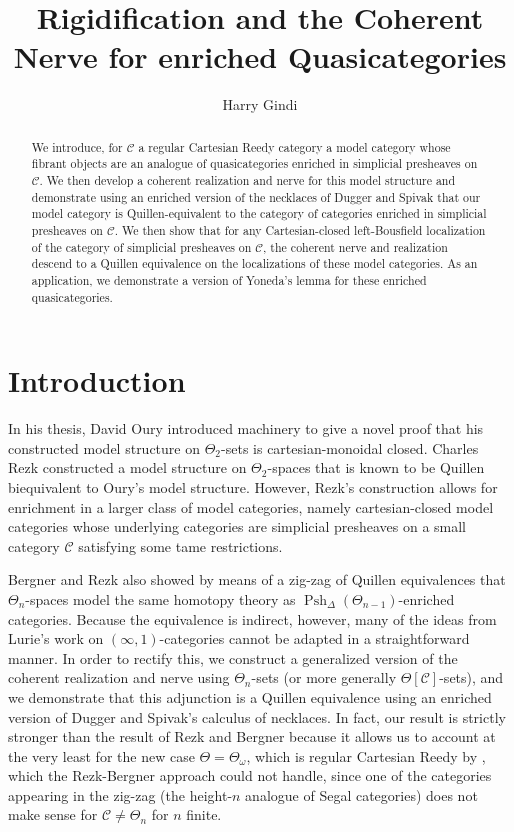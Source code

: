 \documentclass[leqno]{article}
\title{Rigidification and the Coherent Nerve for enriched Quasicategories}
\author{Harry Gindi}
\date{}
\numberwithin{equation}{subsection}
\theoremstyle{plain}   %
\theoremstyle{remark}
\theoremstyle{plain}
\DeclareMathOperator{\Psh}{Psh}
\renewcommand{\C}{\ensuremath{\mathcal{C}}}
\begin{document}
\maketitle

\begin{abstract}
	We introduce, for \(\C\) a regular Cartesian Reedy category a model category whose fibrant objects are an analogue of quasicategories enriched in simplicial presheaves on \(\C\).  We then develop a coherent realization and nerve for this model structure and demonstrate using an enriched version of the necklaces of Dugger and Spivak that our model category is Quillen-equivalent to the category of categories enriched in simplicial presheaves on \(\C\).  We then show that for any Cartesian-closed left-Bousfield localization of the category of simplicial presheaves on \(\C\), the coherent nerve and realization descend to a Quillen equivalence on the localizations of these model categories. As an application, we demonstrate a version of Yoneda's lemma for these enriched quasicategories.
\end{abstract}

\tableofcontents






\section*{Introduction}
In his thesis, David Oury introduced machinery to give a novel proof that his constructed model structure on \(\Theta_2\)-sets is cartesian-monoidal closed. Charles Rezk constructed a model structure on \(\Theta_2\)-spaces that is known to be Quillen biequivalent to Oury's model structure.  However,  Rezk's construction allows for enrichment in a larger class of model categories, namely cartesian-closed model categories whose underlying categories are simplicial presheaves on a small category \(\C\) satisfying some tame restrictions.

Bergner and Rezk also showed by means of a zig-zag of Quillen equivalences that \(\Theta_n\)-spaces model the same homotopy theory as \(\Psh_\Delta(\Theta_{n-1})\)-enriched categories.  Because the equivalence is indirect, however, many of the ideas from Lurie's work on \((\infty,1)\)-categories cannot be adapted in a straightforward manner.  In order to rectify this, we construct a generalized version of the coherent realization and nerve using \(\Theta_n\)-sets (or more generally \(\Theta[\C]\)-sets), and we demonstrate that this adjunction is a Quillen equivalence using an enriched version of Dugger and Spivak's calculus of necklaces. In fact, our result is strictly stronger than the result of Rezk and Bergner because it allows us to account at the very least for the new case \(\Theta=\Theta_\omega\), which is regular Cartesian Reedy by \cite{berger-iterated-wreath}, which the Rezk-Bergner approach could not handle, since one of the categories appearing in the zig-zag (the height-\(n\) analogue of Segal categories) does not make sense for \(\C\neq \Theta_n\) for \(n\) finite.  
\end{document}
